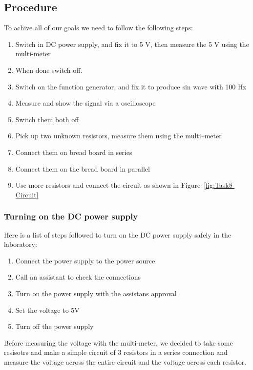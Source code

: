\documentclass[a4paper, 10pt]{article}
\newcommand{\figref}[1]{Figure~\ref{#1}}
\begin{document}
			\subsection{Procedure}
				To achive all of our goals we need to follow the following steps:
				\begin{enumerate}
					\item Switch in DC power supply, and fix it to 5 V, then measure the 5 V using the multi-meter
					\item When done switch off.
					\item Switch on the function generator, and fix it to produce sin wave with 100 Hz
					\item Measure and show the signal via a oscilloscope
					\item Switch them both off
					\item Pick up two unknown resistors, measure them using the multi–meter
					\item Connect them on bread board in series
					\item Connect them on the bread board in parallel
					\item Use more resistors and connect the circuit as shown in \figref{fig:Task8-Circuit}
				\end{enumerate}

				\subsubsection{Turning on the DC power supply}
					Here is a list of steps followed to turn on the DC power supply safely in the laboratory:
					\begin{enumerate}
						\item Connect the power supply to the power source
						\item Call an assistant to check the connections
						\item Turn on the power supply with the assistans approval
						\item Set the voltage to 5V
						\item Turn off the power supply
					\end{enumerate}

					Before measuring the voltage with the multi-meter, we decided to take some resisotrs and make a simple circuit of 3 resistors in a series connection and measure the voltage across the entire
					circuit and the voltage across each resistor.
				
				\pagebreak
\end{document}
